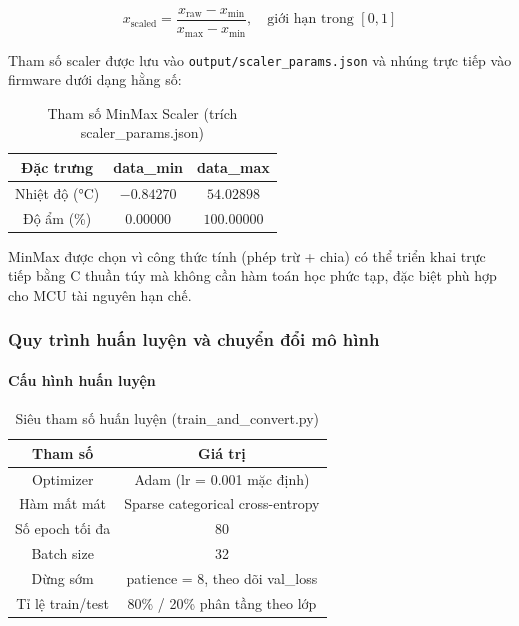 \begin{equation}
x_{\text{scaled}} = \frac{x_{\text{raw}} - x_{\min}}{x_{\max} - x_{\min}}, \quad \text{giới hạn trong } [0, 1]
\label{eq:minmax}
\end{equation}

Tham số scaler được lưu vào \texttt{output/scaler\_params.json} và nhúng trực tiếp vào firmware dưới dạng hằng số:

\begin{table}[h!]
\centering
\caption{Tham số MinMax Scaler (trích scaler\_params.json)}
\label{tab:task5-scaler}
\begin{tabular}{|c|c|c|}
\hline
\textbf{Đặc trưng} & \textbf{data\_min} & \textbf{data\_max} \\
\hline
Nhiệt độ (°C) & $-0.84270$ & $54.02898$ \\
Độ ẩm (\%) & $0.00000$ & $100.00000$ \\
\hline
\end{tabular}
\end{table}

MinMax được chọn vì công thức tính (phép trừ + chia) có thể triển khai trực tiếp bằng C thuần túy mà không cần hàm toán học phức tạp, đặc biệt phù hợp cho MCU tài nguyên hạn chế.

\subsubsection*{Quy trình huấn luyện và chuyển đổi mô hình}

\paragraph{Cấu hình huấn luyện}
\begin{table}[h!]
\centering
\caption{Siêu tham số huấn luyện (train\_and\_convert.py)}
\label{tab:task5-training}
\begin{tabular}{|c|c|}
\hline
\textbf{Tham số} & \textbf{Giá trị} \\
\hline
Optimizer & Adam (lr = 0.001 mặc định) \\
Hàm mất mát & Sparse categorical cross-entropy \\
Số epoch tối đa & 80 \\
Batch size & 32 \\
Dừng sớm & patience = 8, theo dõi val\_loss \\
Tỉ lệ train/test & 80\% / 20\% phân tầng theo lớp \\
\hline
\end{tabular}
\end{table}

